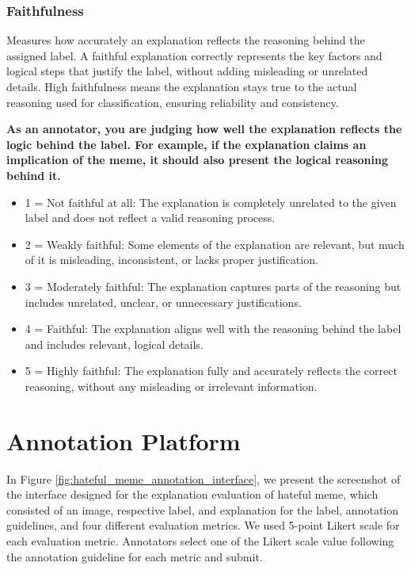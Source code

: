 \subsubsection{Faithfulness}
Measures how accurately an explanation reflects the reasoning behind the assigned label. A faithful explanation correctly represents the key factors and logical steps that justify the label, without adding misleading or unrelated details. High faithfulness means the explanation stays true to the actual reasoning used for classification, ensuring reliability and consistency.

\textbf{As an annotator, you are judging how well the explanation reflects the logic behind the label. For example, if the explanation claims an implication of the meme, it should also present the logical reasoning behind it.}

\begin{itemize}[noitemsep,topsep=0pt,labelsep=.5em] %
    \item 1 = Not faithful at all: The explanation is completely unrelated to the given label and does not reflect a valid reasoning process.
    \item 2 = Weakly faithful: Some elements of the explanation are relevant, but much of it is misleading, inconsistent, or lacks proper justification.
    \item 3 = Moderately faithful: The explanation captures parts of the reasoning but includes unrelated, unclear, or unnecessary justifications.
    \item 4 = Faithful: The explanation aligns well with the reasoning behind the label and includes relevant, logical details.
    \item 5 = Highly faithful: The explanation fully and accurately reflects the correct reasoning, without any misleading or irrelevant information.
\end{itemize}


\section{Annotation Platform}
\label{sec:app_annotation_platform}


In Figure \ref{fig:hateful_meme_annotation_interface}, we present the screenshot of the interface designed for the explanation evaluation of hateful meme, which consisted of an image, respective label, and explanation for the label, annotation guidelines, and four different evaluation metrics. We used 5-point Likert scale for each evaluation metric. Annotators select one of the Likert scale value following the annotation guideline for each metric and submit.

